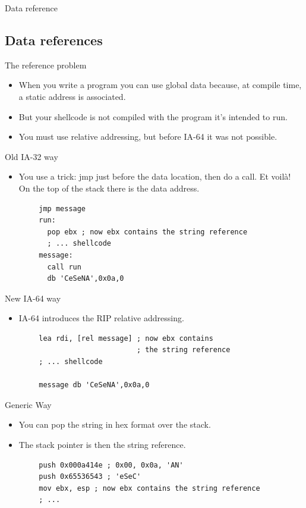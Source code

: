 \begin{frame}{Data reference}
	\subsection{Data references}
	\begin{block}{The reference problem}
		\begin{itemize}
			\item When you write a program you can use global data because, at
				compile time, a static address is associated.
			\item But your shellcode is not compiled with the program it's intended to run.
			\item You must use relative addressing, but before IA-64 it was not possible.
		\end{itemize}
	\end{block}

	\framebreak

	\begin{block}{Old IA-32 way}
		\begin{itemize}
			\item You use a trick: jmp just before the data location, then do a call.
				Et voilà! On the top of the stack there is the data address.
		\end{itemize}
	\end{block}
	\acode
	\begin{lstlisting}
		jmp message
		run:
		  pop ebx ; now ebx contains the string reference
		  ; ... shellcode
		message:
		  call run
		  db 'CeSeNA',0x0a,0
	\end{lstlisting}
	\begin{block}{New IA-64 way}
		\begin{itemize}
			\item IA-64 introduces the RIP relative addressing.
		\end{itemize}
	\end{block}
	\acode
	\begin{lstlisting}
		lea rdi, [rel message] ; now ebx contains
		                       ; the string reference
		; ... shellcode

		message	db 'CeSeNA',0x0a,0
	\end{lstlisting}
	\begin{block}{Generic Way}
		\begin{itemize}
			\item You can pop the string in hex format over the stack.
			\item The stack pointer is then the string reference.
		\end{itemize}
	\end{block}
	\acode
	\begin{lstlisting}
		push 0x000a414e ; 0x00, 0x0a, 'AN'
		push 0x65536543 ; 'eSeC'
		mov ebx, esp ; now ebx contains the string reference
		; ...
	\end{lstlisting}


\end{frame}
